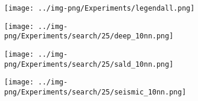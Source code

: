\newcommand{\soneMs}{0.19}
\begin{figure}[!htb]
    \centering    
    \begin{minipage}{\textwidth}
        \begin{subfigure}{\textwidth}
            \centering
            \captionsetup{justification=centering}	
            \texttt{[image: ../img-png/Experiments/legendall.png]}
        \end{subfigure}
    \end{minipage}
    
	\begin{minipage}{0.6\textwidth}
		\captionsetup{justification=centering}
		\captionsetup[subfigure]{justification=centering}
        \begin{subfigure}{0.029\textwidth}
        \end{subfigure}
		\begin{subfigure}{0.314\textwidth}
			\texttt{[image: ../img-png/Experiments/search/25/deep\_10nn.png]}
			\caption{}  
			\label{fig:elpis:query:performance:25GB:deep:10NN}
		\end{subfigure}
		\begin{subfigure}{0.314\textwidth}
			\texttt{[image: ../img-png/Experiments/search/25/sald\_10nn.png]}
			\caption{}  
			\label{fig:elpis:query:performance:25GB:sald:10NN}
		\end{subfigure}
		\begin{subfigure}{0.314\textwidth}
			\texttt{[image: ../img-png/Experiments/search/25/seismic\_10nn.png]}
			\caption{}  
			\label{fig:elpis:query:performance:25GB:seismic:10NN}
		\end{subfigure}	


\end{minipage}
\end{figure}
